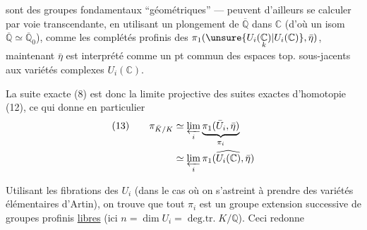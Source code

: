 sont des groupes fondamentaux ``géométriques'' ---  peuvent d'ailleurs se calculer par voie transcendante, en utilisant un plongement de $\overline{\mathbb Q}$ dans $\mathbb C$ (d'où un isom $\overline{\mathbb Q}\simeq\overline{\mathbb Q}_0$), comme les complétés profinis des $\pi_1(\unsure{U_i(\underset{k}{\mathbb C})|U_i(\mathbb C)},\bar\eta)$,  maintenant $\bar\eta$ est interprété comme un pt  commun des espaces top. sous-jacents aux variétés complexes $U_i(\mathbb C)$.

La suite exacte (8) est donc la limite projective des suites exactes d'homotopie (12), ce qui donne en particulier
\[
\begin{aligned}
(13)\qquad \pi_{\bar K/K}&\simeq\varprojlim_i\underbrace{\pi_1(\bar U_i,\bar\eta)}_{\pi_i}\\
&\simeq\varprojlim_i\widehat{\pi_1(U_i(\mathbb C),\bar\eta)}
\end{aligned}
\]

Utilisant les fibrations des $U_i$ (dans le cas où on s'astreint à prendre des variétés élémentaires d'Artin), on trouve que tout $\pi_i$ est un groupe  extension successive de  groupes profinis \uline{libres} (ici $n=\dim U_i=\operatorname{deg.tr.}K/\mathbb Q$). Ceci redonne
